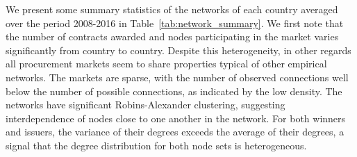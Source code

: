 We present some summary statistics of the networks of each country averaged over the period 2008-2016 in Table~\ref{tab:network_summary}. We first note that the number of contracts awarded and nodes participating in the market varies significantly from country to country. Despite this heterogeneity, in other regards all procurement markets seem to share properties typical of other empirical networks. The markets are sparse, with the number of observed connections well below the number of possible connections, as indicated by the low density. The networks have significant Robins-Alexander clustering, suggesting interdependence of nodes close to one another in the network. For both winners and issuers, the variance of their degrees exceeds the average of their degrees, a signal that the degree distribution for both node sets is heterogeneous.

